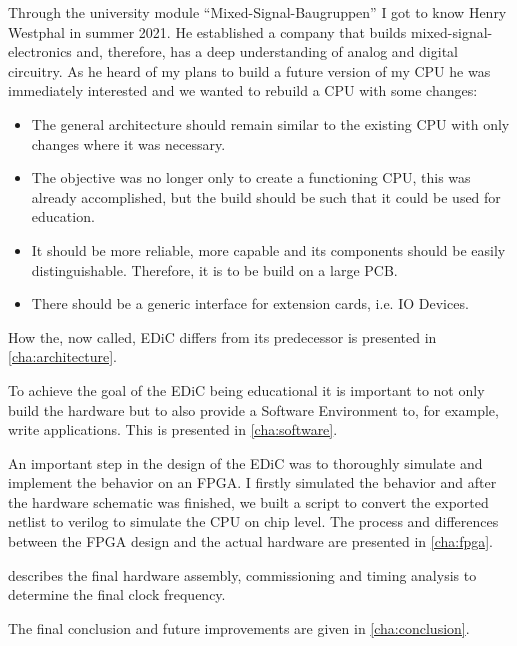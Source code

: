 Through the university module ``Mixed-Signal-Baugruppen'' I got to know Henry Westphal in summer 2021.
He established a company that builds mixed-signal-electronics and, therefore, has a deep understanding of analog and digital circuitry.
As he heard of my plans to build a future version of my \gls{CPU} he was immediately interested and we wanted to rebuild a \gls{CPU} with some changes:
\begin{itemize}
  \item The general architecture should remain similar to the existing \gls{CPU} with only changes where it was necessary.
  \item The objective was no longer only to create a functioning \gls{CPU}, this was already accomplished, but the build should be such that it could be used for education.
  \item It should be more reliable, more capable and its components should be easily distinguishable. Therefore, it is to be build on a large \gls{PCB}.
  \item There should be a generic interface for extension cards, i.e. IO Devices.
\end{itemize}
How the, now called, \gls{EDiC} differs from its predecessor is presented in \cref{cha:architecture}.

To achieve the goal of the \gls{EDiC} being educational it is important to not only build the hardware but to also provide a Software Environment to, for example, write applications.
This is presented in \cref{cha:software}.

An important step in the design of the \gls{EDiC} was to thoroughly simulate and implement the behavior on an \gls{FPGA}.
I firstly simulated the behavior and after the hardware schematic was finished, we built a script to convert the exported netlist to verilog to simulate the \gls{CPU} on chip level.
The process and differences between the \gls{FPGA} design and the actual hardware are presented in \cref{cha:fpga}.

 describes the final hardware assembly, commissioning and timing analysis to determine the final clock frequency.

The final conclusion and future improvements are given in \cref{cha:conclusion}.


\label{sec:outputBuffer}
